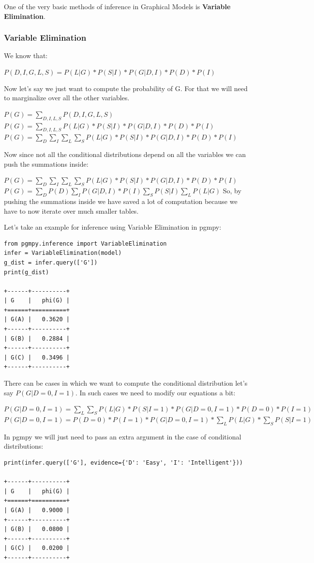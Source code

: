 \documentclass{article}
\begin{document}
One of the very basic methods of inference in Graphical Models is \textbf{Variable Elimination}.

\subsubsection{Variable Elimination}

We know that:

$ P(D, I, G, L, S) = P(L|G) * P(S|I) * P(G|D, I) * P(D) * P(I) $

Now let's say we just want to compute the probability of G. For that we will need to marginalize over all the other variables.

$ P(G) = \sum_{D, I, L, S} P(D, I, G, L, S) $ $ P(G) = \sum_{D, I, L, S} P(L|G) * P(S|I) * P(G|D, I) * P(D) * P(I) $ $ P(G) = \sum_D \sum_I \sum_L \sum_S P(L|G) * P(S|I) * P(G|D, I) * P(D) * P(I) $

Now since not all the conditional distributions depend on all the variables we can push the summations inside:

$ P(G) = \sum_D \sum_I \sum_L \sum_S P(L|G) * P(S|I) * P(G|D, I) * P(D) * P(I) $
$ P(G) = \sum_D P(D) \sum_I P(G|D, I) * P(I) \sum_S P(S|I) \sum_L P(L|G) $
So, by pushing the summations inside we have saved a lot of computation because we have to now iterate over much smaller tables.

Let's take an example for inference using Variable Elimination in pgmpy:

\begin{verbatim}
from pgmpy.inference import VariableElimination
infer = VariableElimination(model)
g_dist = infer.query(['G'])
print(g_dist)

+------+----------+
| G    |   phi(G) |
+======+==========+
| G(A) |   0.3620 |
+------+----------+
| G(B) |   0.2884 |
+------+----------+
| G(C) |   0.3496 |
+------+----------+
\end{verbatim}

There can be cases in which we want to compute the conditional distribution let's say $ P(G | D=0, I=1) $. In such cases we need to modify our equations a bit:

$ P(G | D=0, I=1) = \sum_L \sum_S P(L|G) * P(S| I=1) * P(G| D=0, I=1) * P(D=0) * P(I=1) $ $ P(G | D=0, I=1) = P(D=0) * P(I=1) * P(G | D=0, I=1) * \sum_L P(L | G) * \sum_S P(S | I=1) $

In pgmpy we will just need to pass an extra argument in the case of conditional distributions:

\begin{verbatim}
print(infer.query(['G'], evidence={'D': 'Easy', 'I': 'Intelligent'}))

+------+----------+
| G    |   phi(G) |
+======+==========+
| G(A) |   0.9000 |
+------+----------+
| G(B) |   0.0800 |
+------+----------+
| G(C) |   0.0200 |
+------+----------+
\end{verbatim}
\end{document}
